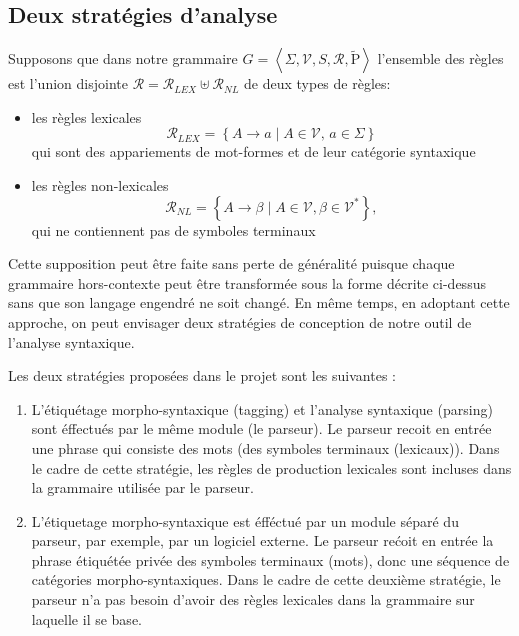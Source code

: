 \documentclass[12pt]{article}
\begin{document}
\subsection{Deux strat\'egies d'analyse}

Supposons que dans notre grammaire $G = \left< \Sigma, \mathscr{V}, S, \mathscr{R}, \tilde{\mathrm{P}} \right>$ l'ensemble des r\`egles est l'union disjointe $\mathscr{R} = \mathscr{R}_{LEX} \uplus \mathscr{R}_{NL}$ de deux types de r\`egles:

\begin{itemize}
\item les r\`egles lexicales
$$\mathscr{R}_{LEX} = \left\{ A \rightarrow a \mid
        A \in \mathscr{V}, \, a \in \Sigma \right\}$$
qui sont des appariements de mot-formes et de leur cat\'egorie syntaxique
\item les r\`egles non-lexicales
$$\mathscr{R}_{NL} = \left\{ A \rightarrow \beta \mid
     A \in \mathscr{V}, \beta \in \mathscr{V}^* \right\},$$
qui ne contiennent pas de symboles terminaux
\end{itemize}

Cette supposition peut \^etre faite sans perte de g\'en\'eralit\'e puisque
chaque grammaire hors-contexte peut \^etre transform\'ee sous la forme d\'ecrite ci-dessus sans
que son langage engendr\'e ne soit chang\'e. En m\^eme temps, en adoptant cette
approche, on peut envisager deux strat\'egies de conception de notre outil de
l'analyse syntaxique.

Les deux strat\'egies propos\'ees dans le projet sont les suivantes :
\begin{enumerate}
  \item L'\'etiqu\'etage morpho-syntaxique (tagging) et l'analyse syntaxique
  (parsing) sont \'effectu\'es par le m\^eme module (le parseur). Le
  parseur recoit en entr\'ee une phrase qui consiste des mots (des symboles terminaux (lexicaux)).
  Dans le cadre de cette strat\'egie, les r\`egles de production lexicales sont
  incluses dans la grammaire utilis\'ee par le parseur.
  \item L'\'etiquetage morpho-syntaxique est \'eff\'ectu\'e par un module s\'epar\'e du
  parseur, par exemple, par un logiciel externe. Le parseur re\'coit en entr\'ee la
  phrase \'etiqu\'et\'ee priv\'ee des symboles terminaux (mots), donc une s\'equence de
  cat\'egories morpho-syntaxiques. Dans le cadre de cette deuxi\`eme strat\'egie, le
  parseur n'a pas besoin d'avoir des r\`egles lexicales dans la grammaire sur
  laquelle il se base.
\end{enumerate}
\end{document}
